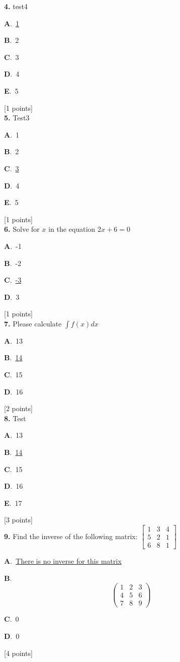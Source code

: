 \documentclass[12pt]{article}
\newcommand{\choice}[3]{%
  \noindent\textbf{#1}.~#2\hfill#3\par\vspace{0.25em}
}
\begin{document}
\noindent \textbf{\textenglish{4.}} {\textenglish{test4}}

\noindent\choice{A}{\underline{{\textenglish{1}}}}{}
\noindent\choice{B}{{\textenglish{2}}}{}
\noindent\choice{C}{{\textenglish{3}}}{}
\noindent\choice{D}{{\textenglish{4}}}{}
\noindent\choice{E}{{\textenglish{5}}}{}
\hfill {\textenglish{[1 points]}}\\[0.5em]

\noindent \textbf{\textenglish{5.}} {\textenglish{Test3}}

\noindent\choice{A}{{\textenglish{1}}}{}
\noindent\choice{B}{{\textenglish{2}}}{}
\noindent\choice{C}{\underline{{\textenglish{3}}}}{}
\noindent\choice{D}{{\textenglish{4}}}{}
\noindent\choice{E}{{\textenglish{5}}}{}
\hfill {\textenglish{[1 points]}}\\[0.5em]

\noindent \textbf{\textenglish{6.}} {\textenglish{Solve for }}\(x \){\textenglish{ in the equation }}\(2x+6 = 0 \)

\noindent\choice{A}{{\textenglish{-1}}}{}
\noindent\choice{B}{{\textenglish{-2}}}{}
\noindent\choice{C}{\underline{{\textenglish{-3}}}}{}
\noindent\choice{D}{{\textenglish{3}}}{}
\hfill {\textenglish{[1 points]}}\\[0.5em]

\noindent \textbf{\textenglish{7.}} {\textenglish{Please calculate }}\(\int f(x)dx\)

\noindent\choice{A}{{\textenglish{13}}}{}
\noindent\choice{B}{\underline{{\textenglish{14}}}}{}
\noindent\choice{C}{{\textenglish{15}}}{}
\noindent\choice{D}{{\textenglish{16}}}{}
\hfill {\textenglish{[2 points]}}\\[0.5em]

\noindent \textbf{\textenglish{8.}} {\textenglish{Test}}

\noindent\choice{A}{{\textenglish{13}}}{}
\noindent\choice{B}{\underline{{\textenglish{14}}}}{}
\noindent\choice{C}{{\textenglish{15}}}{}
\noindent\choice{D}{{\textenglish{16}}}{}
\noindent\choice{E}{{\textenglish{17}}}{}
\hfill {\textenglish{[3 points]}}\\[0.5em]

\noindent \textbf{\textenglish{9.}} {\textenglish{Find the inverse of the following matrix: }}\(\begin{bmatrix} 1 & 3 & 4 \\ 5 & 2 & 1 \\ 6 & 8 & 1 \end{bmatrix}\)

\noindent\choice{A}{\underline{{\textenglish{There is no inverse for this matrix}}}}{}
\noindent\choice{B}{\[\begin{pmatrix} 1 & 2 & 3 \\ 4 & 5 & 6 \\ 7 & 8 & 9  \end{pmatrix}\]}{}
\noindent\choice{C}{{\textenglish{0}}}{}
\noindent\choice{D}{{\textenglish{0}}}{}
\hfill {\textenglish{[4 points]}}\\[0.5em]
\end{document}
